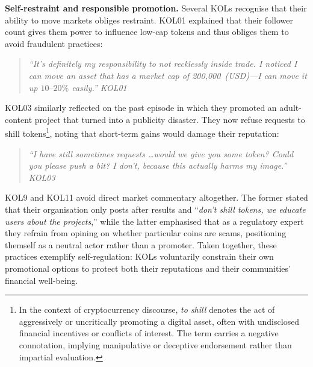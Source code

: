\noindent\textbf{Self-restraint and responsible promotion.} Several KOLs recognise that their ability to move markets obliges restraint.  KOL01 explained that their follower count gives them power to influence low-cap tokens and thus obliges them to avoid fraudulent practices:  
\begin{quote}\itshape
``It's definitely my responsibility to not recklessly inside trade.  I noticed I can move an asset that has a market cap of 200{,}000~(USD)—I can move it up $10\text{--}20\%$ easily.''  \textemdash{} KOL01
\end{quote}
KOL03 similarly reflected on the past episode in which they promoted an adult-content project that turned into a publicity disaster.  They now refuse requests to shill tokens\footnote{In the context of cryptocurrency discourse, \emph{to shill} denotes the act of aggressively or uncritically promoting a digital asset, often with undisclosed financial incentives or conflicts of interest. The term carries a negative connotation, implying manipulative or deceptive endorsement rather than impartial evaluation.}, noting that short-term gains would damage their reputation:  
\begin{quote}\itshape
``I have still sometimes requests \ldots would we give you some token?  Could you please push a bit?  I don't, because this actually harms my image.''  \textemdash{} KOL03
\end{quote}
KOL9 and KOL11 avoid direct market commentary altogether.  The former stated that their organisation only posts after results and ``\emph{don't shill tokens, we educate users about the projects},'' while the latter emphasised that as a regulatory expert they refrain from opining on whether particular coins are scams, positioning themself as a neutral actor rather than a promoter. Taken together, these practices exemplify self-regulation: KOLs voluntarily constrain their own promotional options to protect both their reputations and their communities' financial well-being.

